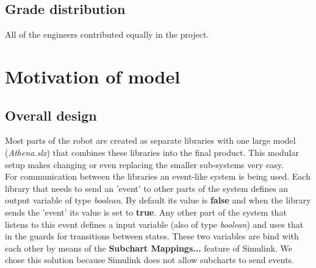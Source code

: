 \documentclass[a4paper,12pt]{article}
\begin{document}
\subsection{Grade distribution}
All of the engineers contributed equally in the project. 
\section{Motivation of model}
\subsection{Overall design}
Most parts of the robot are created as separate libraries with one large model (\textit{Athena.slx}) that combines these libraries into the final product. This modular setup makes changing or even replacing the smaller sub-systems very easy.\\
For communication between the libraries an event-like system is being used. Each library that needs to send an 'event' to other parts of the system defines an output variable of type \textit{boolean}. By default its value is \textbf{false} and when the library sends the 'event' its value is set to \textbf{true}. Any other part of the system that listens to this event defines a input variable (also of type \textit{boolean}) and uses that in the guards for transitions between states. These two variables are bind with each other by means of the \textbf{Subchart Mappings...} feature of Simulink. We chose this solution because Simulink does not allow subcharts to send events.
\end{document}
